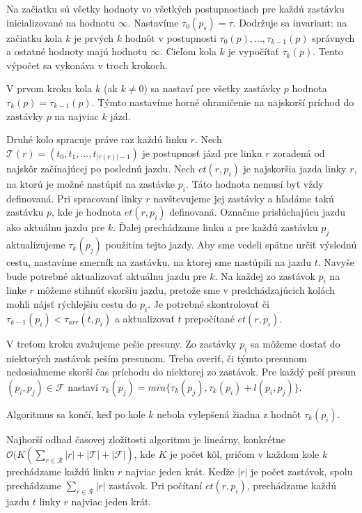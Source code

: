 Na začiatku sú všetky hodnoty vo všetkých postupnostiach pre každú zastávku inicializované na hodnotu $\infty$. Nastavíme $\tau_0(p_s) = \tau$. Dodržuje sa invariant: na začiatku kola $k$ je prvých $k$ hodnôt v postupnosti $\tau_0(p), ..., \tau_{k-1}(p)$ správnych a ostatné hodnoty majú hodnotu $\infty$. Cieľom kola $k$ je vypočítať $\tau_k(p)$. Tento výpočet sa vykonáva v troch krokoch. 
 
V prvom kroku kola $k$ (ak $k \neq 0$) sa nastaví pre všetky zastávky $p$ hodnota $\tau_k(p) = \tau_{k-1}(p)$. Týmto nastavíme horné ohraničenie na najskorší príchod do zastávky $p$ na najviac $k$ jázd.

Druhé kolo spracuje práve raz každú linku $r$. Nech $\mathcal{T}(r) = (t_0, t_1, ..., t_{|\tau(r)|-1})$ je postupnosť jázd pre linku $r$ zoradená od najskôr začínajúcej po poslednú jazdu. Nech $et(r, p_i)$ je najskoršia jazda linky $r$, na ktorú je možné nastúpiť na zastávke $p_i$. Táto hodnota nemusí byť vždy definovaná. Pri spracovaní linky $r$ navštevujeme jej zastávky a hľadáme takú zastávku $p$, kde je hodnota $et(r, p_i)$ definovaná. Označme prislúchajúcu jazdu ako aktuálnu jazdu pre $k$. Ďalej prechádzame linku a pre každú zastávku $p_j$ aktualizujeme $\tau_k(p_j)$ použitím tejto jazdy. Aby sme vedeli spätne určiť výslednú cestu, nastavíme smerník na zastávku, na ktorej sme nastúpili na jazdu $t$. Navyše bude potrebné aktualizovať aktuálnu jazdu pre $k$. Na každej zo zastávok $p_i$ na linke $r$ môžeme stihnúť skoršiu jazdu, pretože sme v predchádzajúcich kolách mohli nájsť rýchlejšiu cestu do $p_i$. Je potrebné skontrolovať či $\tau_{k-1}(p_i) < \tau_{arr}(t, p_i)$ a aktualizovať $t$ prepočítané $et(r, p_i)$.

V treťom kroku zvažujeme pešie presuny. Zo zastávky $p_i$ sa môžeme dostať do niektorých zastávok peším presunom. Treba overiť, či týmto presunom nedosiahneme skorší čas príchodu do niektorej zo zastávok. Pre každý peší presun $(p_i, p_j) \in \mathcal{F}$ nastaví $\tau_k(p_j) = min\{\tau_k(p_j), \tau_k(p_i) + l(p_i, p_j)\}$. 

Algoritmus sa končí, keď po kole $k$ nebola vylepšená žiadna z hodnôt $\tau_k(p_i)$. 

Najhorší odhad časovej zložitosti algoritmu je lineárny, konkrétne $\mathcal{O}(K(\sum_{r \in \mathcal{R}} |r| + |\mathcal{T}| + |\mathcal{F}|)$, kde $K$ je počet kôl, pričom v každom kole $k$ prechádzame každú linku $r$ najviac jeden krát. Keďže $|r|$ je počet zastávok, spolu prechádzame $\sum_{r \in \mathcal{R}} |r|$ zastávok. Pri počítaní $et(r, p_i)$, prechádzame každú jazdu $t$ linky $r$ najviac jeden krát. 


